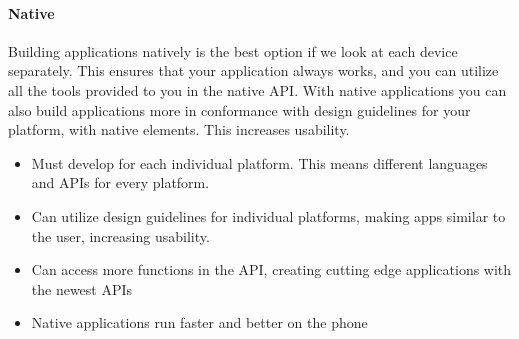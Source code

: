 \paragraph{\bf{Native}}
	Building applications natively is the best option if we look at each device
	separately. This ensures that your application always works, and you can
	utilize all the tools provided to you in the native API. With native
	applications you can also build applications more in conformance with design
	guidelines for your platform, with native elements. This increases
	usability.

	\begin{itemize}
		\item Must develop for each individual platform. This means different
		languages and APIs for every platform.
		\item Can utilize design guidelines for individual platforms, making
		apps similar to the user, increasing usability.
		\item Can access more functions in the API, creating cutting edge
		applications with the newest APIs
		\item Native applications run faster and better on the phone
	\end{itemize}
